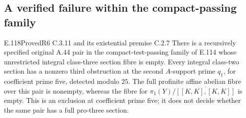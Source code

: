 \subsection{A verified failure within the compact-passing family}

\begin{result}{E.118}{Proved}{R6 C.3.11 and its existential premise C.2.7}
There is a recursively specified original A.44 pair in the
compact-test-passing family of E.114 whose unrestricted integral
class-three section fibre is empty. Every integral class-two section
has a nonzero third obstruction at the second $A$-support prime
$q_1$, for coefficient prime five, detected modulo $25$.
The full profinite affine abelian fibre over this pair is nonempty,
whereas the fibre for $\pi_1(Y)/\overline{[[K,K],[K,K]]}$ is empty.
This is an exclusion at coefficient prime five; it does not decide
whether the same pair has a full pro-three section.
\end{result}
